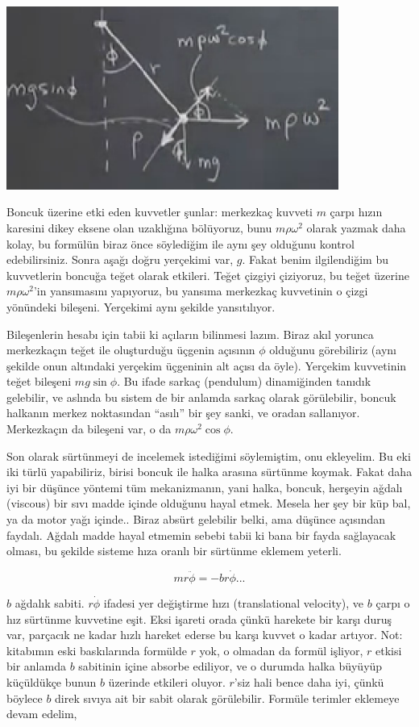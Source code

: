 \documentclass[12pt,fleqn]{article}\usepackage{../../common}
\begin{document}
\includegraphics[height=6cm]{03_03.png}

Boncuk üzerine etki eden kuvvetler şunlar: merkezkaç kuvveti $m$ çarpı hızın
karesini dikey eksene olan uzaklığına bölüyoruz, bunu $m\rho\omega^2$ olarak
yazmak daha kolay, bu formülün biraz önce söylediğim ile aynı şey olduğunu
kontrol edebilirsiniz. Sonra aşağı doğru yerçekimi var, $g$. Fakat benim
ilgilendiğim bu kuvvetlerin boncuğa teğet olarak etkileri. Teğet çizgiyi
çiziyoruz, bu teğet üzerine $m\rho\omega^2$'in yansımasını yapıyoruz, bu yansıma
merkezkaç kuvvetinin o çizgi yönündeki bileşeni. Yerçekimi aynı şekilde
yansıtılıyor. 

Bileşenlerin hesabı için tabii ki açıların bilinmesi lazım. Biraz akıl yorunca
merkezkaçın teğet ile oluşturduğu üçgenin açısının $\phi$ olduğunu görebiliriz
(aynı şekilde onun altındaki yerçekim üçgeninin alt açısı da öyle). Yerçekim
kuvvetinin teğet bileşeni $mg\sin\phi$. Bu ifade sarkaç (pendulum) dinamiğinden
tanıdık gelebilir, ve aslında bu sistem de bir anlamda sarkaç olarak
görülebilir, boncuk halkanın merkez noktasından ``asılı'' bir şey sanki, ve
oradan sallanıyor. Merkezkaçın da bileşeni var, o da $m\rho\omega^2\cos\phi$. 

Son olarak sürtünmeyi de incelemek istediğimi söylemiştim, onu ekleyelim. Bu eki
iki türlü yapabiliriz, birisi boncuk ile halka arasına sürtünme koymak. Fakat
daha iyi bir düşünce yöntemi tüm mekanizmanın, yani halka, boncuk, herşeyin
ağdalı (viscous) bir sıvı madde içinde olduğunu hayal etmek. Mesela her şey bir
küp bal, ya da motor yağı içinde.. Biraz absürt gelebilir belki, ama düşünce
açısından faydalı. Ağdalı madde hayal etmemin sebebi tabii ki bana bir fayda
sağlayacak olması, bu şekilde sisteme hıza oranlı bir sürtünme eklemem yeterli.

$$ mr\ddot{\phi} = -br\dot{\phi} ... $$

$b$ ağdalık sabiti. $r\dot{\phi}$ ifadesi yer değiştirme hızı (translational
velocity), ve $b$ çarpı o hız sürtünme kuvvetine eşit. Eksi işareti orada çünkü
harekete bir karşı duruş var, parçacık ne kadar hızlı hareket ederse bu karşı
kuvvet o kadar artıyor. Not: kitabımın eski baskılarında formülde $r$ yok, o
olmadan da formül işliyor, $r$ etkisi bir anlamda $b$ sabitinin içine absorbe
ediliyor, ve o durumda halka büyüyüp küçüldükçe bunun $b$ üzerinde etkileri
oluyor. $r$'siz hali bence daha iyi, çünkü böylece $b$ direk sıvıya ait bir
sabit olarak görülebilir. Formüle terimler eklemeye devam edelim,
\end{document}
